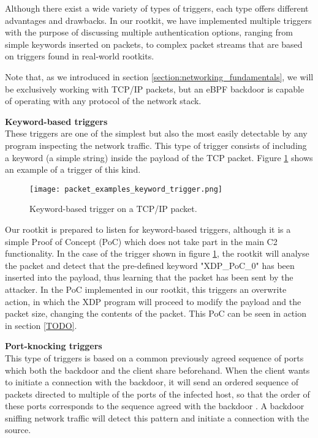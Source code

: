 Although there exist a wide variety of types of triggers, each type offers different advantages and drawbacks. In our rootkit, we have implemented multiple triggers with the purpose of discussing multiple authentication options, ranging from simple keywords inserted on packets, to complex packet streams that are based on triggers found in real-world rootkits.

Note that, as we introduced in section \ref{section:networking_fundamentals}, we will be exclusively working with TCP/IP packets, but an eBPF backdoor is capable of operating with any protocol of the network stack.

\textbf{Keyword-based triggers}\\
These triggers are one of the simplest but also the most easily detectable by any program inspecting the network traffic. This type of trigger consists of including a keyword (a simple string) inside the payload of the TCP packet. Figure \ref{fig:keyword_trigger} shows an example of a trigger of this kind.

\begin{figure}[htbp]
	\centering
	\texttt{[image: packet\_examples\_keyword\_trigger.png]}
	\caption{Keyword-based trigger on a TCP/IP packet.}
	\label{fig:keyword_trigger}
\end{figure}

Our rootkit is prepared to listen for keyword-based triggers, although it is a simple Proof of Concept (PoC) which does not take part in the main C2 functionality. In the case of the trigger shown in figure \ref{fig:keyword_trigger}, the rootkit will analyse the packet and detect that the pre-defined keyword "XDP\_PoC\_0" has been inserted into the payload, thus learning that the packet has been sent by the attacker. In the PoC implemented in our rootkit, this triggers an overwrite action, in which the XDP program will proceed to modify the payload and the packet size, changing the contents of the packet. This PoC can be seen in action in section \ref{TODO}.

\textbf{Port-knocking triggers}\\
This type of triggers is based on a common previously agreed sequence of ports which both the backdoor and the client share beforehand. When the client wants to initiate a connection with the backdoor, it will send an ordered sequence of packets directed to multiple of the ports of the infected host, so that the order of these ports corresponds to the sequence agreed with the backdoor \cite{port_knocking}. A backdoor sniffing network traffic will detect this pattern and initiate a connection with the source.

